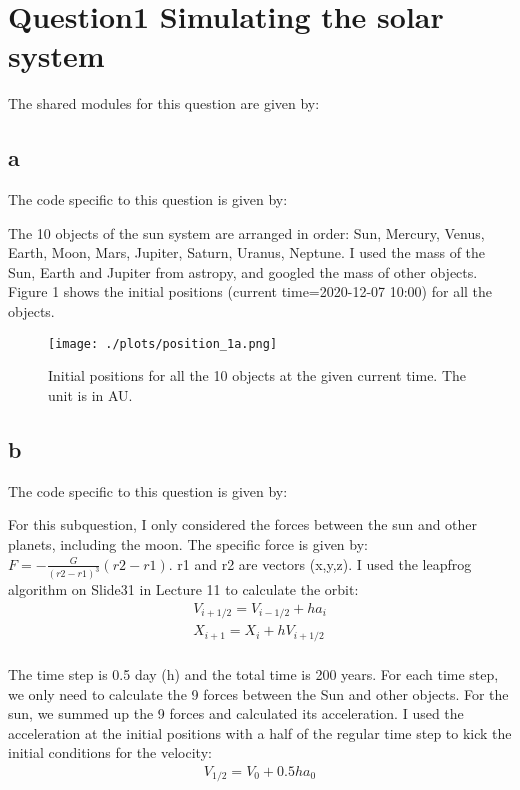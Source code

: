 \section{Question1  Simulating the solar system}
The shared modules for this question are given by:



\subsection{a}
The code specific to this question is given by:

The 10 objects of the sun system are arranged in order: Sun, Mercury, Venus, Earth, Moon, Mars, Jupiter, Saturn, Uranus, Neptune. I used the mass of the Sun, Earth and Jupiter from astropy, and googled the mass of other objects. Figure 1 shows the initial positions (current time=2020-12-07 10:00) for all the objects.

\begin{figure}[h!]
  \centering
  \texttt{[image: ./plots/position\_1a.png]}
  \caption{Initial positions for all the 10 objects at the given current time. The unit is in AU.}
  \label{fig1}
\end{figure}


\subsection{b}
The code specific to this question is given by:


For this subquestion, I only considered the forces between the sun and other planets, including the moon. The specific force is given by: $F=-\frac{G}{(r2-r1)^3}(r2-r1)$. r1 and r2 are vectors (x,y,z). I used the leapfrog algorithm on Slide31 in Lecture 11 to calculate the orbit:
\begin{equation}
  \label{eq:1}
  \begin{aligned}
    V_{i+1/2} = V_{i-1/2} + ha_i\\
    X_{i+1} = X_{i} + hV_{i+1/2}\\
  \end{aligned}
\end{equation}

The time step is 0.5 day (h) and the total time is 200 years. For each time step, we only need to calculate the 9 forces between the Sun and other objects. For the sun, we summed up the 9 forces and calculated its acceleration. I used the acceleration at the initial positions with a half of the regular time step to kick the initial conditions for the velocity:
\begin{equation}
  \label{eq:2}
  \begin{aligned}
    V_{1/2} = V_{0} + 0.5ha_0\\
  \end{aligned}
\end{equation}

